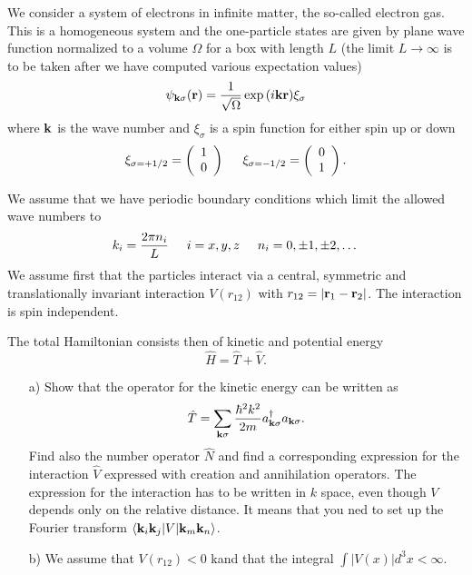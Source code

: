 \begin{prob}
We consider a system of electrons in infinite matter, the so-called electron gas. This is a homogeneous system and the one-particle states are given by plane wave function normalized to a volume $\Omega$ 
for a box with length $L$ (the limit $L\rightarrow \infty$ is to be taken after we have computed various expectation values)
\[
\psi_{{\bf k}\sigma}({\bf r})= \frac{1}{\sqrt{\Omega}}\exp{(i{\bf kr})}\xi_{\sigma}
\]
where ${\bf k}$ is the wave number and  $\xi_{\sigma}$ is a spin function for either spin up or down
\[ 
\xi_{\sigma=+1/2}=\left(\begin{array}{c} 1 \\ 0 \end{array}\right) \hspace{0.5cm}
\xi_{\sigma=-1/2}=\left(\begin{array}{c} 0 \\ 1 \end{array}\right).\]

We assume that we have periodic boundary conditions which limit the allowed wave numbers to
\[
k_i=\frac{2\pi n_i}{L}\hspace{0.5cm} i=x,y,z \hspace{0.5cm} n_i=0,\pm 1,\pm 2, \dots
\]
We assume first that the particles interact via a central, symmetric and translationally invariant
interaction  $V(r_{12})$ with
$r_{12}=|{\bf r}_1-{\bf r}_2|$.  The interaction is spin independent.

The total Hamiltonian consists then of kinetic and potential energy
\[
\hat{H} = \hat{T}+\hat{V}.
\]
\begin{enumerate}
\item[a)] Show that the operator for the kinetic energy can be written as
\[
\hat{T}=\sum_{{\bf k}\sigma}\frac{\hbar^2k^2}{2m}a_{{\bf k}\sigma}^{\dagger}a_{{\bf k}\sigma}.
\]
Find also the number operator $\hat{N}$ and find a corresponding expression for the interaction
$\hat{V}$ expressed with creation and annihilation operators.   The expression for the interaction
has to be written in  $k$ space, even though $V$ depends only on the relative distance. It means that you ned to set up the Fourier transform $\langle {\bf k}_i{\bf k}_j| V | {\bf k}_m{\bf k}_n\rangle$.
\item[b)] We assume that  $V(r_{12}) < 0$ kand that the integral 
$\int |V(x)| d^3x < \infty$.


\end{enumerate}
\end{prob}
